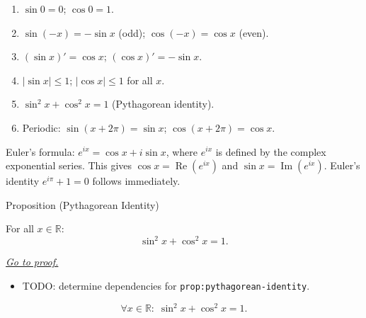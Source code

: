 \begin{remark*}
\begin{enumerate}[label=(\roman*)]
  \item $\sin 0 = 0$;\; $\cos 0 = 1$.
  \item $\sin(-x) = -\sin x$ (odd);\; $\cos(-x) = \cos x$ (even).
  \item $(\sin x)' = \cos x$;\; $(\cos x)' = -\sin x$.
  \item $|\sin x| \leq 1$;\; $|\cos x| \leq 1$ for all $x$.
  \item $\sin^2 x + \cos^2 x = 1$ (Pythagorean identity).
  \item Periodic: $\sin(x+2\pi) = \sin x$;\; $\cos(x+2\pi) = \cos x$.
\end{enumerate}
\end{remark*}

\begin{remark*}[Relationship to $e^{ix}$]
Euler's formula: $e^{ix} = \cos x + i\sin x$, where $e^{ix}$ is
defined by the complex exponential series. This gives $\cos x =
\operatorname{Re}(e^{ix})$ and $\sin x = \operatorname{Im}(e^{ix})$.
Euler's identity $e^{i\pi} + 1 = 0$ follows immediately.
\end{remark*}


\begin{propositionbox}{Proposition (Pythagorean Identity)}
\begin{proposition}
\label{prop:pythagorean-identity}
For all $x \in \mathbb{R}$:
\[
  \sin^2 x + \cos^2 x = 1.
\]

\smallskip\noindent
\hyperref[prf:pythagorean-identity]{\textit{Go to proof.}}
\end{proposition}
\end{propositionbox}

\begin{dependencies}
\begin{itemize}
  \item TODO: determine dependencies for \texttt{prop:pythagorean-identity}.
\end{itemize}
\end{dependencies}

\begin{remark*}
\[
  \forall x \in \mathbb{R} :\; \sin^2 x + \cos^2 x = 1.
\]
\end{remark*}

